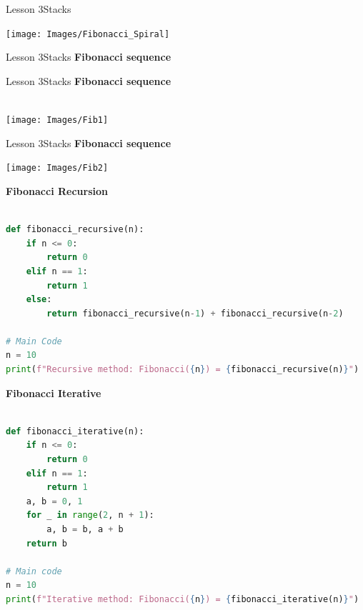 \documentclass[aspectratio=1610]{beamer}
\begin{document}
\begin{frame}{Lesson 3}{Stacks}
\begin{center}
\texttt{[image: Images/Fibonacci\_Spiral]}
\end{center}
\end{frame}



\begin{frame}{Lesson 3}{Stacks}
\Huge 
\textbf{Fibonacci sequence}
\end{frame}


\begin{frame}{Lesson 3}{Stacks}
\LARGE
\textbf{Fibonacci sequence}\\~\\
\begin{center}
\texttt{[image: Images/Fib1]}
\end{center}
\end{frame}


\begin{frame}{Lesson 3}{Stacks}
\LARGE
\textbf{Fibonacci sequence}
\begin{center}
\texttt{[image: Images/Fib2]}
\end{center}
\end{frame}


\begin{frame}[fragile]
\Large
\textbf{Fibonacci Recursion}\\~\\
\begin{lstlisting}[language=Python]
def fibonacci_recursive(n):
    if n <= 0:
        return 0
    elif n == 1:
        return 1
    else:
        return fibonacci_recursive(n-1) + fibonacci_recursive(n-2)

# Main Code
n = 10
print(f"Recursive method: Fibonacci({n}) = {fibonacci_recursive(n)}")
 \end{lstlisting}
\end{frame} 



\begin{frame}[fragile]
\Large
\textbf{Fibonacci Iterative}\\~\\
\begin{lstlisting}[language=Python]
def fibonacci_iterative(n):
    if n <= 0:
        return 0
    elif n == 1:
        return 1
    a, b = 0, 1
    for _ in range(2, n + 1):
        a, b = b, a + b
    return b

# Main code
n = 10
print(f"Iterative method: Fibonacci({n}) = {fibonacci_iterative(n)}")
 \end{lstlisting}
\end{frame} 
\end{document}

